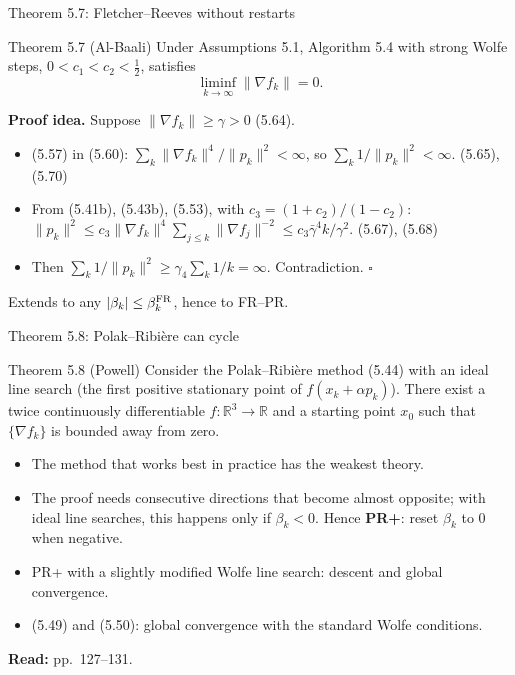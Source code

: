 \documentclass[12pt,aspectratio=169]{beamer}
\newcommand{\readpp}[1]{{\color{red!80!black}\textbf{Read:} #1}}
\newcommand{\R}{\mathbb{R}}
\begin{document}
\begin{frame}{Theorem 5.7: Fletcher--Reeves without restarts}
  \begin{block}{Theorem 5.7 (Al-Baali)}
    Under Assumptions 5.1, Algorithm 5.4 with strong Wolfe steps, $0<c_1<c_2<\tfrac12$, satisfies
    \begin{equation}
      \liminf_{k\to\infty}\|\nabla f_k\|=0. \tag{5.63}
    \end{equation}
  \end{block}
  \textbf{Proof idea.} Suppose $\|\nabla f_k\|\ge\gamma>0$ (5.64).
  \begin{itemize}
    \item (5.57) in (5.60): $\sum_k\|\nabla f_k\|^4/\|p_k\|^2<\infty$, so $\sum_k1/\|p_k\|^2<\infty$. \hfill (5.65), (5.70)
    \item From (5.41b), (5.43b), (5.53), with $c_3=(1+c_2)/(1-c_2)$:
      $\|p_k\|^2\le c_3\|\nabla f_k\|^4\sum_{j\le k}\|\nabla f_j\|^{-2}\le c_3\bar\gamma^4k/\gamma^2$. \hfill (5.67), (5.68)
    \item Then $\sum_k1/\|p_k\|^2\ge\gamma_4\sum_k1/k=\infty$. Contradiction. \hfill$\square$
  \end{itemize}
  Extends to any $|\beta_k|\le\beta_k^{\rm FR}$, hence to FR--PR.
\end{frame}

\begin{frame}{Theorem 5.8: Polak--Ribi\`ere can cycle}
  \begin{block}{Theorem 5.8 (Powell)}
    Consider the Polak--Ribi\`ere method (5.44) with an ideal line search (the first positive stationary point of $f(x_k+\alpha p_k)$).
    There exist a twice continuously differentiable $f:\R^3\to\R$ and a starting point $x_0$
    such that $\{\nabla f_k\}$ is bounded away from zero.
  \end{block}
  \begin{itemize}
    \item The method that works best in practice has the weakest theory.
    \item The proof needs consecutive directions that become almost opposite;
      with ideal line searches, this happens only if $\beta_k<0$.
      Hence \textbf{PR+}: reset $\beta_k$ to 0 when negative.
    \item PR+ with a slightly modified Wolfe line search: descent and global convergence.
    \item (5.49) and (5.50): global convergence with the standard Wolfe conditions.
  \end{itemize}
  \readpp{pp.~127--131.}
\end{frame}
\end{document}
